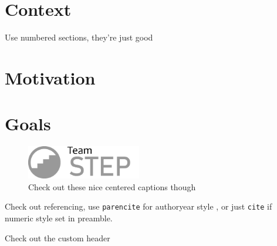 \section{Context}

Use numbered sections, they're just good

\section{Motivation}

\section{Goals}

\begin{figure} %
    \centering
    \includegraphics[width=5cm]{images/teamstep-logo.png}
    \caption{Check out these nice centered captions though}
    \label{fig:my_label}
\end{figure}

Check out referencing, use \texttt{parencite} for authoryear style \parencite{reflabel}, or just \texttt{cite} if numeric style set in preamble. \lipsum[4] 

\lipsum[5] 

\lipsum[6] 

\lipsum[7]

\begin{invsummary}
Check out the custom header
\end{invsummary}